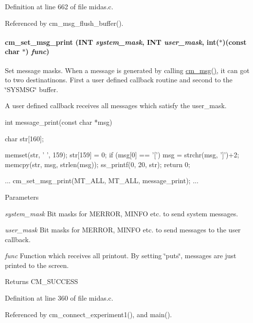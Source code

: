 Definition at line 662 of file midas.c.

Referenced by cm\_\-msg\_\-flush\_\-buffer().
\paragraph[{cm\_\-set\_\-msg\_\-print}]{ cm\_\-set\_\-msg\_\-print ({\bf INT} {\em system\_\-mask}, \/  {\bf INT} {\em user\_\-mask}, \/  int($\ast$)(const char $\ast$) {\em func})}\hfill\label{group__msgfunctionc_gafe6ff62436845805cd87a7ea1bd3b4dd}
Set message masks. When a message is generated by calling \hyperlink{group__msgfunctionc_gaac032ca2438c47466bfc9722de6746ea}{cm\_\-msg()}, it can got to two destinatinons. First a user defined callback routine and second to the \char`\"{}SYSMSG\char`\"{} buffer.

A user defined callback receives all messages which satisfy the user\_\-mask.


\begin{DoxyCode}
int message_print(const char *msg)
{
  char str[160];

  memset(str, ' ', 159);
  str[159] = 0;
  if (msg[0] == '[')
    msg = strchr(msg, ']')+2;
  memcpy(str, msg, strlen(msg));
  ss_printf(0, 20, str);
  return 0;
}
...
  cm_set_msg_print(MT_ALL, MT_ALL, message_print);
...
\end{DoxyCode}
 
\begin{DoxyParams}{Parameters}
\item[{\em system\_\-mask}]Bit masks for MERROR, MINFO etc. to send system messages. \item[{\em user\_\-mask}]Bit masks for MERROR, MINFO etc. to send messages to the user callback. \item[{\em func}]Function which receives all printout. By setting \char`\"{}puts\char`\"{}, messages are just printed to the screen. \end{DoxyParams}
\begin{DoxyReturn}{Returns}
CM\_\-SUCCESS 
\end{DoxyReturn}


Definition at line 360 of file midas.c.

Referenced by cm\_\-connect\_\-experiment1(), and main().